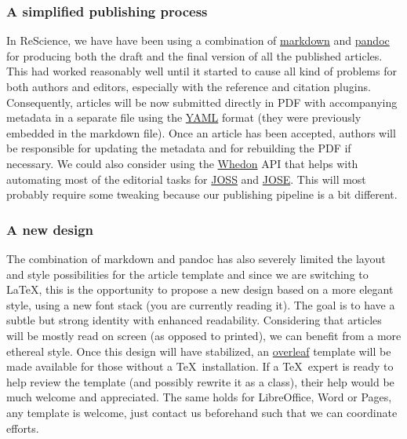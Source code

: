 \subsubsection{A simplified publishing process}

In ReScience, we have have been using a combination of
\href{https://daringfireball.net/projects/markdown/syntax}{markdown} and
\href{http://pandoc.org/}{pandoc} for producing both the draft and the final
version of all the published articles. This had worked reasonably well until it
started to cause all kind of problems for both authors and editors, especially
with the reference and citation plugins. Consequently, articles will be now
submitted directly in PDF with accompanying metadata in a separate file using
the \href{https://en.wikipedia.org/wiki/YAML}{YAML} format (they were
previously embedded in the markdown file). Once an article has been accepted,
authors will be responsible for updating the metadata and for rebuilding the PDF if
necessary. We could also consider using the
\href{https://github.com/openjournals/whedon}{Whedon} API that helps with automating
most of the editorial tasks for \href{http://joss.theoj.org/}{JOSS} and
\href{http://jose.theoj.org/}{JOSE}. This will most probably require some
tweaking because our publishing pipeline is a bit different.


\subsubsection{A new design}

The combination of markdown and pandoc has also severely limited the layout and
style possibilities for the article template and since we are switching to
\LaTeX, this is the opportunity to propose a new design based on a more elegant
style, using a new font stack\supercite{SourceSerifPro:2014, Roboto:2011,
  SourceCodePro:2012} (you are currently reading it). The goal is to have a
subtle but strong identity with enhanced readability. Considering that articles
will be mostly read on screen (as opposed to printed), we can benefit from a
more ethereal style. Once this design will have stabilized, an
\href{https://www.overleaf.com/}{overleaf} template will be made available for
those without a \TeX~installation. If a \TeX~expert is ready to help review
the template (and possibly rewrite it as a class), their help would be much
welcome and appreciated. The same holds for LibreOffice, Word or Pages, any
template is welcome, just contact us beforehand such that we can coordinate
efforts.


